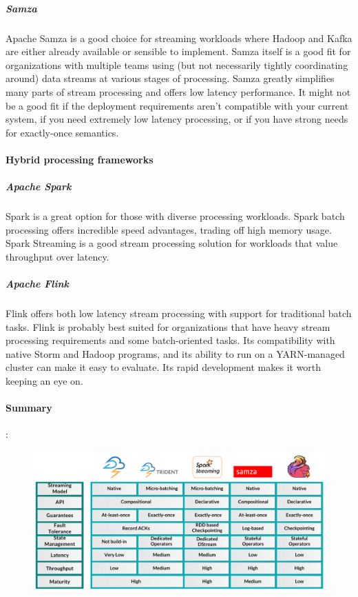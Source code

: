 \subparagraph{Samza}
\label{sec:sec01}
Apache Samza is a good choice for streaming workloads where Hadoop and Kafka are either already available or sensible to implement. Samza itself is a good fit for organizations with multiple teams using (but not necessarily tightly coordinating around) data streams at various stages of processing. Samza greatly simplifies many parts of stream processing and offers low latency performance. It might not be a good fit if the deployment requirements aren't compatible with your current system, if you need extremely low latency processing, or if you have strong needs for exactly-once semantics.
\paragraph{Hybrid processing frameworks}
\label{sec:sec01}
\subparagraph{Apache Spark }
\label{sec:sec01}
Spark is a great option for those with diverse processing workloads. Spark batch processing offers incredible speed advantages, trading off high memory usage. Spark Streaming is a good stream processing solution for workloads that value throughput over latency. 

\subparagraph{Apache Flink}
\label{sec:sec01}
Flink offers both low latency stream processing with support for traditional batch tasks. 
Flink is probably best suited for organizations that have heavy stream processing requirements and some batch-oriented tasks. 
Its compatibility with native Storm and Hadoop programs, and its ability to run on a YARN-managed cluster can make it easy to evaluate. 
Its rapid development makes it worth keeping an eye on.


\paragraph{Summary} :\\
\label{sec:sec01}   

\begin{figure}[h!]
	\centering
	\includegraphics[height=0.3\textheight]{fig01/BigDataProcessing}
	\label{fig:FilialesEtClients}
\end{figure}

